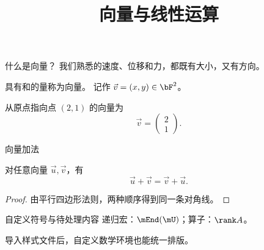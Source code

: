 \documentclass{beamer}
\title{向量与线性运算}
\begin{document}
\begin{frame}{什么是向量？}
我们熟悉的速度、位移和力，都既有大小，又有方向。
\begin{definition}[几何向量]
具有和的量称为向量。
记作 $\vec v=(x,y)\in\bF^2$。
\end{definition}
\pp
\begin{example}
从原点指向点 $(2,1)$ 的向量为
\[\vec v=\begin{pmatrix}2\\1\end{pmatrix}.\]
\end{example}
\end{frame}

\begin{frame}{向量加法}
\begin{theorem}[交换律]
对任意向量 $\vec u,\vec v$，有
\[\vec u+\vec v=\vec v+\vec u.\]
\end{theorem}
\pause
\begin{proof}
由平行四边形法则，两种顺序得到同一条对角线。
\end{proof}
\end{frame}

\begin{frame}{自定义符号与待处理内容}
递归宏：$\mEnd(\mU)$；算子：$\rank A$。
\begin{observation}
导入样式文件后，自定义数学环境也能统一排版。
\end{observation}
\end{frame}
\end{document}
